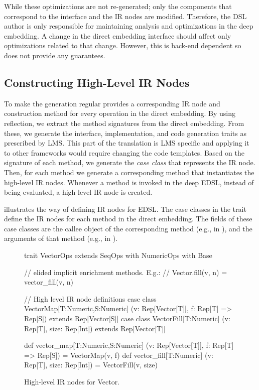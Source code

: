  While these optimizations are not re-generated; only the
 components that correspond to the interface and the IR nodes are
 modified. Therefore, the DSL author is only responsible for
 maintaining analysis and optimizations in the deep embedding. A change
 in the direct embedding interface should affect only optimizations
 related to that change. However, this is back-end dependent so \yy
 does not provide any guarantees.



\subsection{Constructing High-Level IR Nodes}
\label{sec:yy-impl-def}

To make the generation regular \yy provides a corresponding IR node and
construction method for every operation in the direct embedding. By using
reflection, we extract the method signatures from the direct embedding. From
these, we generate the interface, implementation, and code generation traits as
prescribed by LMS. This part of the translation is LMS specific and applying it
to other frameworks would require changing the code templates. Based on the
signature of each method, we generate the \emph{case class} that represents the
IR node. Then, for each method we generate a corresponding method that
instantiates the high-level IR nodes. Whenever a method is invoked in the deep
EDSL, instead of being evaluated, a high-level IR node is created.

 illustrates the way of defining IR nodes for
 EDSL. The case classes in the  trait define the
IR nodes for each method in the direct embedding. The fields of these case
classes are the callee object of the corresponding method (e.g.,  in
), and the arguments of that method (e.g.,  in
).

\begin{figure}
\begin{listingtiny}
trait VectorOps extends SeqOps with
  NumericOps with Base {
  // elided implicit enrichment methods. E.g.:
  //   Vector.fill(v, n) = vector_fill(v, n)

  // High level IR node definitions
  case class VectorMap[T:Numeric,S:Numeric]
    (v: Rep[Vector[T]], f: Rep[T] => Rep[S])
    extends Rep[Vector[S]]
  case class VectorFill[T:Numeric]
    (v: Rep[T], size: Rep[Int])
    extends Rep[Vector[T]]

  def vector_map[T:Numeric,S:Numeric]
    (v: Rep[Vector[T]], f: Rep[T] => Rep[S]) =
      VectorMap(v, f)
  def vector_fill[T:Numeric]
    (v: Rep[T], size: Rep[Int]) =
    VectorFill(v, size)
}
\end{listingtiny}
\caption{\label{lst:vector_deep_ir} High-level IR nodes for Vector.}
\end{figure}

